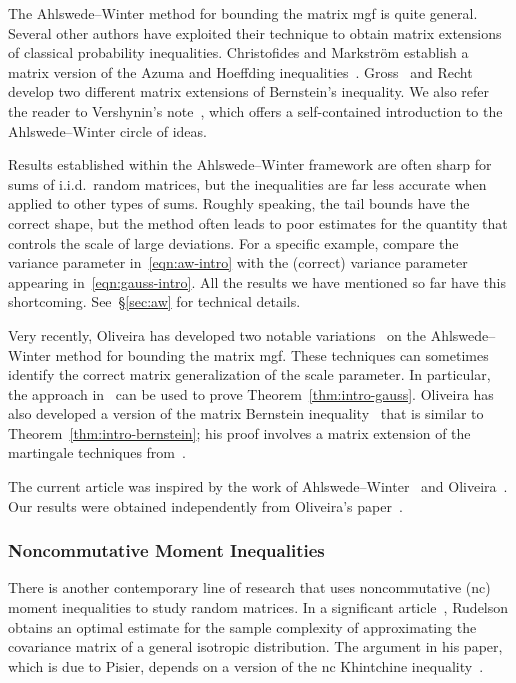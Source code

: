 \documentclass[11pt,letterpaper,twoside,reqno,draft]{amsart}
\theoremstyle{remark}
\numberwithin{equation}{section}
\numberwithin{thm}{section}
\begin{document}
The Ahlswede--Winter method for bounding the matrix mgf is quite general.  Several other authors have exploited their technique to obtain matrix extensions of classical probability inequalities.  Christofides and Markstr{\"o}m establish a matrix version of the Azuma and Hoeffding inequalities~\cite{CM08:Expansion-Properties}.  Gross~\cite[Thm.~6]{Gro11:Recovering-Low-Rank} and Recht~\cite[Thm.~3.2]{Rec09:Simpler-Approach} develop two different matrix extensions of Bernstein's inequality.  We also refer the reader to Vershynin's note~\cite{Ver09:Note-Sums}, which offers a self-contained introduction to the Ahlswede--Winter circle of ideas.

Results established within the Ahlswede--Winter framework are often sharp for sums of i.i.d.~random matrices, but the inequalities are far less accurate when applied to other types of sums.  Roughly speaking, the tail bounds have the correct shape, but the method often leads to poor estimates for the quantity that controls the scale of large deviations.  For a specific example, compare the variance parameter in~\eqref{eqn:aw-intro} with the (correct) variance parameter appearing in~\eqref{eqn:gauss-intro}.  All the results we have mentioned so far have this shortcoming.  See~\S\ref{sec:aw} for technical details.

Very recently, Oliveira has developed two notable variations~\cite{Oli10:Sums-Random,Oli10:Concentration-Adjacency} on the Ahlswede--Winter method for bounding the matrix mgf.  These techniques can sometimes identify the correct matrix generalization of the scale parameter.  In particular, the approach in~\cite{Oli10:Sums-Random} can be used to prove Theorem~\ref{thm:intro-gauss}.  Oliveira has also developed a version of the matrix Bernstein inequality~\cite[Thm.~1.2]{Oli10:Concentration-Adjacency} that is similar to Theorem~\ref{thm:intro-bernstein}; his proof involves a matrix extension of the martingale techniques from~\cite{Fre75:Tail-Probabilities}.

The current article was inspired by the work of Ahlswede--Winter~\cite{AW02:Strong-Converse} and Oliveira~\cite{Oli10:Sums-Random}.  Our results were obtained independently from Oliveira's paper~\cite{Oli10:Concentration-Adjacency}.

\subsubsection{Noncommutative Moment Inequalities}

There is another contemporary line of research that uses noncommutative (nc) moment inequalities to study random matrices.  In a significant article~\cite{Rud99:Random-Vectors}, Rudelson obtains an optimal estimate for the sample complexity of approximating the covariance matrix of a general isotropic distribution.  The argument in his paper, which is due to Pisier, depends on a version of the nc Khintchine inequality~\cite{L-P86:Inegalites-Khintchine,LPP91:Noncommutative-Khintchine,Pis03:Introduction-Operator}.  
\end{document}
